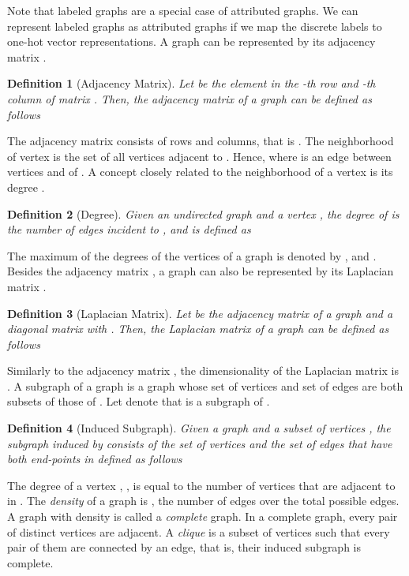 \documentclass[twoside,11pt]{article}
\newtheorem{definition}{Definition}
\begin{document}
Note that labeled graphs are a special case of attributed graphs.
We can represent labeled graphs as attributed graphs if we map the discrete labels to one-hot vector representations.
A graph  can be represented by its adjacency matrix .
\begin{definition}[Adjacency Matrix]
    Let  be the element in the -th row and -th column of matrix .
    Then, the adjacency matrix  of a graph  can be defined as follows
    
\end{definition}
The adjacency matrix  consists of  rows and  columns, that is .
The neighborhood  of vertex  is the set of all vertices adjacent to .
Hence,  where  is an edge between vertices  and  of .
A concept closely related to the neighborhood of a vertex  is its degree .
\begin{definition}[Degree]
    Given an undirected graph  and a vertex , the degree of  is the number of edges incident to , and is defined as
    
\end{definition}
The maximum of the degrees of the vertices of a graph is denoted by , and .
Besides the adjacency matrix , a graph  can also be represented by its Laplacian matrix .
\begin{definition}[Laplacian Matrix]
    Let  be the adjacency matrix of a graph  and  a diagonal matrix with .
    Then, the Laplacian matrix  of a graph  can be defined as follows
    
\end{definition}
Similarly to the adjacency matrix , the dimensionality of the Laplacian matrix is .
A subgraph of a graph  is a graph whose set of vertices and set of edges are both subsets of those of .
Let  denote that  is a subgraph of .
\begin{definition}[Induced Subgraph]
    Given a graph  and a subset of vertices , the subgraph  induced by  consists of the set of vertices  and the set of edges  that have both end-points in  defined as follows
    
\end{definition}
The degree of a vertex , , is equal to the number of vertices that are adjacent to  in .
The \textit{density} of a graph  is , the number of edges  over the total possible edges.
A graph  with density  is called a \textit{complete} graph.
In a complete graph, every pair of distinct vertices are adjacent.
A \textit{clique} is a subset of vertices such that every pair of them are connected by an edge, that is, their induced subgraph is complete.
\end{document}
